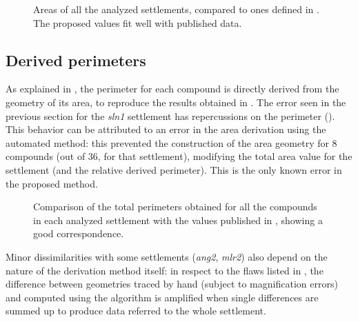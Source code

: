             \begin{figure}[H]
                \centering
                \begin{tikzpicture}
                    
                \end{tikzpicture}
                \caption[Areas of all the analyzed settlements compared with ones published in \cite{laterza}.]{Areas of all the analyzed settlements, compared to ones defined in \cite{laterza}. The proposed values fit well with published data.}
                \label{fig:graph-area}
            \end{figure}

        \subsection{Derived perimeters}
            
            As explained in , the perimeter for each compound is directly derived from the geometry of its area, to reproduce the results obtained in \cite{laterza}. The error seen in the previous section for the \emph{sln1} settlement has repercussions on the perimeter (). This behavior can be attributed to an error in the area derivation using the automated method: this prevented the construction of the area geometry for 8 compounds (out of 36, for that settlement), modifying the total area value for the settlement (and the relative derived perimeter). This is the only known error in the proposed method.

            \begin{figure}[H]
                \centering
                \begin{tikzpicture}
                    
                \end{tikzpicture}
                \caption[Comparison of published perimeters with ones obtained with the proposed method.]{Comparison of the total perimeters obtained for all the compounds in each analyzed settlement with the values published in \cite{laterza}, showing a good correspondence.}
                \label{fig:graph-perim}
            \end{figure}

            Minor dissimilarities with some settlements (\emph{ang2}, \emph{mlr2}) also depend on the nature of the derivation method itself: in respect to the flaws listed in , the difference between geometries traced by hand (subject to magnification errors) and computed using the algorithm is amplified when single differences are summed up to produce data referred to the whole settlement.

